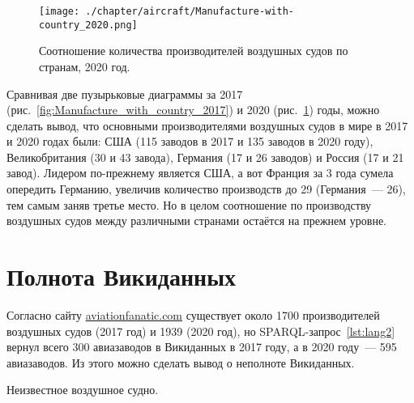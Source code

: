 \begin{figure}[h!]
\centering
	\texttt{[image: ./chapter/aircraft/Manufacture-with-country\_2020.png]}
	\caption{Соотношение количества производителей воздушных судов по странам, 2020 год.}
	\label{fig:Manufacture_with_country_2020}
\end{figure}

\label{fig:Manufacture_with_country_2017_2}

Сравнивая две пузырьковые диаграммы за 2017 (рис.~\ref{fig:Manufacture_with_country_2017}) и 2020 (рис.~\ref{fig:Manufacture_with_country_2020}) годы, можно сделать вывод, что основными производителями воздушных судов в мире 
в 2017 и 2020 годах были: США (115 заводов в 2017 и 135 заводов в 2020 году), Великобритания (30 и 43 завода), Германия (17 и 26 заводов) и Россия (17 и 21 завод). Лидером по-прежнему является США, а вот Франция за 3 года сумела опередить Германию, увеличив количество производств до 29 (Германия~--- 26), тем самым заняв третье место. Но в целом соотношение по производству воздушных судов между различными странами остаётся на прежнем уровне.

\section{Полнота Викиданных}

Согласно сайту \href{https://www.aviationfanatic.com/}{aviationfanatic.com} существует около \num{1700} производителей воздушных судов\cite{count_of_aircraft_manufactures} (2017 год) и \num{1939} (2020 год), но SPARQL-запрос~\ref{lst:lang2} вернул всего 300 авиазаводов в Викиданных в 2017 году, а в 2020 году~--- 595 авиазаводов. Из этого можно сделать вывод о неполноте Викиданных.  

\label{aircraft_question_5}


\begin{marginfigure}[0.0cm]
{%
\setlength{\fboxsep}{0pt}%
\setlength{\fboxrule}{1pt}%
%
}
  \caption{Неизвестное воздушное судно.}%
  \label{fig:airship_question_aircraft}%
\end{marginfigure}


